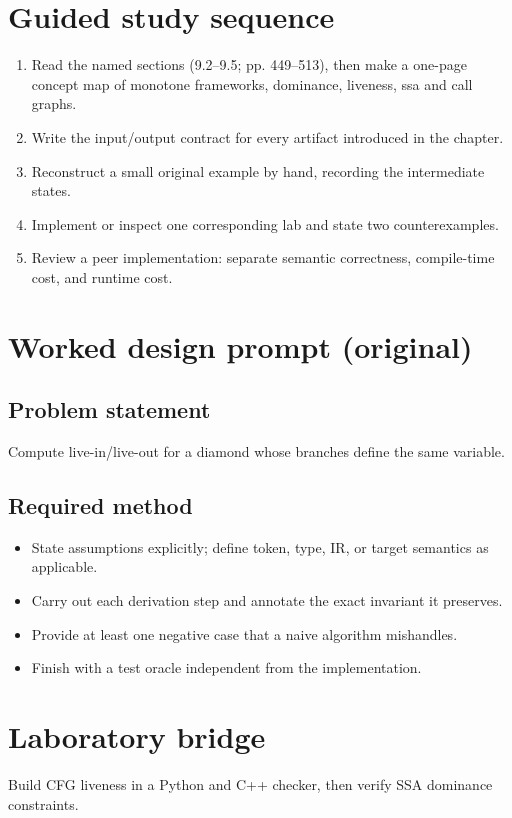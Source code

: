\documentclass[10pt,letterpaper]{article}
\begin{document}
\section{Guided study sequence}
\begin{enumerate}
\item Read the named sections (9.2--9.5; pp. 449--513), then make a one-page concept map of monotone frameworks, dominance, liveness, ssa and call graphs.
\item Write the input/output contract for every artifact introduced in the chapter.
\item Reconstruct a small original example by hand, recording the intermediate states.
\item Implement or inspect one corresponding lab and state two counterexamples.
\item Review a peer implementation: separate semantic correctness, compile-time cost, and runtime cost.
\end{enumerate}

\section{Worked design prompt (original)}
\subsection{Problem statement}
Compute live-in/live-out for a diamond whose branches define the same variable.
\subsection{Required method}
\begin{itemize}
\item State assumptions explicitly; define token, type, IR, or target semantics as applicable.
\item Carry out each derivation step and annotate the exact invariant it preserves.
\item Provide at least one negative case that a naive algorithm mishandles.
\item Finish with a test oracle independent from the implementation.
\end{itemize}


\section{Laboratory bridge}
Build CFG liveness in a Python and C++ checker, then verify SSA dominance constraints.
\end{document}
